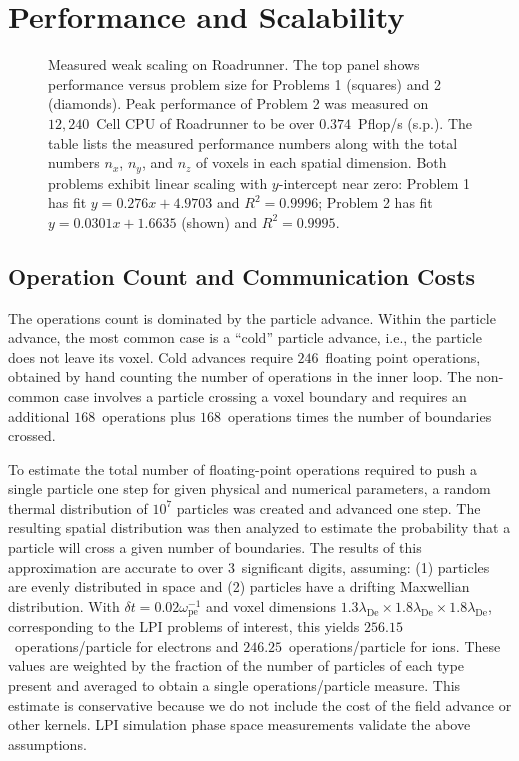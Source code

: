 \documentclass[journal,twoside]{IEEEtran}
\newcommand{\lde}      {\lambda_{\mathrm{De}}}
\newcommand{\wpe}      {\omega_{\mathrm{pe}}}
\begin{document}
\section{Performance and Scalability} \label{sec:performance}

\begin{figure}
\begin{center}
\caption{
Measured weak scaling on Roadrunner.  The top panel shows performance
versus problem size for Problems 1 (squares) and 2 (diamonds).  Peak
performance of Problem 2 was measured on $12,240$~Cell CPU of
Roadrunner to be over $0.374$~Pflop/s (s.p.).  The table lists the
measured performance numbers along with the total numbers $n_x$,
$n_y$, and $n_z$ of voxels in each spatial dimension.  Both problems
exhibit linear scaling with $y$-intercept near zero: Problem 1 has fit
$y=0.276x + 4.9703$ and $R^2=0.9996$; Problem 2 has fit $y=0.0301x +
1.6635$ (shown) and $R^2 = 0.9995$.}
\label{fig:weakscaling}
\end{center}
\end{figure}

\subsection{Operation Count and Communication Costs}

The operations count is dominated by the particle advance.  Within the
particle advance, the most common case is a ``cold'' particle advance,
i.e., the particle does not leave its voxel.  Cold advances require
$246$~floating point operations, obtained by hand counting the number
of operations in the inner loop.  The non-common case involves a
particle crossing a voxel boundary and requires an additional
$168$~operations plus $168$~operations times the number of boundaries
crossed.

To estimate the total number of floating-point operations required to
push a single particle one step for given physical and numerical
parameters, a random thermal distribution of $10^7$ particles was
created and advanced one step.  The resulting spatial distribution was
then analyzed to estimate the probability that a particle will cross a
given number of boundaries.  The results of this approximation are
accurate to over $3$~significant digits, assuming: (1) particles are
evenly distributed in space and (2) particles have a drifting
Maxwellian distribution.  With $\delta t = 0.02 \wpe^{-1}$ and voxel
dimensions $1.3\lde \times 1.8\lde \times 1.8\lde$, corresponding to
the LPI problems of interest, this yields $256.15$~operations/particle
for electrons and $246.25$~operations/particle for ions.  These values
are weighted by the fraction of the number of particles of each type
present and averaged to obtain a single operations/particle measure.
This estimate is conservative because we do not include the cost of
the field advance or other kernels.  LPI simulation phase space
measurements validate the above
assumptions.~\cite{Yin_et_al_Phys_Plasmas_2007_SRS}
\end{document}
